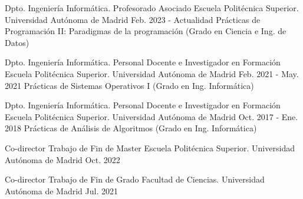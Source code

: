 

\begin{cventries}

  \cventry
    {Dpto. Ingeniería Informática.} %
    {Profesorado Asociado} %
    {Escuela Politécnica Superior. Universidad Autónoma de Madrid} %
    {Feb. 2023 - Actualidad} %
    {Prácticas de Programación II: Paradigmas de la programación (Grado en Ciencia e Ing. de Datos)}
    

  \cventry
    {Dpto. Ingeniería Informática.} %
    {Personal Docente e Investigador en Formación} %
    {Escuela Politécnica Superior. Universidad Autónoma de Madrid} %
    {Feb. 2021 - May. 2021} %
    {Prácticas de Sistemas Operativos I (Grado en Ing. Informática)}
    
  \cventry
    {Dpto. Ingeniería Informática.} %
    {Personal Docente e Investigador en Formación} %
    {Escuela Politécnica Superior. Universidad Autónoma de Madrid} %
    {Oct. 2017 - Ene. 2018} %
    {Prácticas de Análisis de Algoritmos (Grado en Ing. Informática)}
    
    
  \cventry
    {Co-director} %
    {Trabajo de Fin de Master} %
    {Escuela Politécnica Superior. Universidad Autónoma de Madrid} %
    {Oct. 2022} %
    {
      \begin{cvitems} %
        \item {}
      \end{cvitems}
    }

  \cventry
    {Co-director} %
    {Trabajo de Fin de Grado} %
    {Facultad de Ciencias. Universidad Autónoma de Madrid} %
    {Jul. 2021} %
    {
      \begin{cvitems} %
        \item {
        }
      \end{cvitems}
    }
    

\end{cventries}
